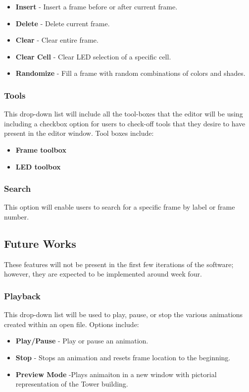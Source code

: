 \documentclass[]{article}
\begin{document}
\begin{itemize}
\item \textbf{Insert} - Insert a frame before or after current frame.
\item \textbf{Delete} - Delete current frame.
\item \textbf{Clear} - Clear entire frame.
\item \textbf{Clear Cell} - Clear LED selection of a specific cell.
\item \textbf{Randomize} - Fill a frame with random combinations of colors and shades.
\end{itemize}

\subsubsection{Tools}

{This drop-down list will include all the tool-boxes that the editor will be using including a checkbox option for users to check-off tools that they desire to have present in the editor window. Tool boxes include:}

\begin{itemize}
\item \textbf{Frame toolbox}
\item \textbf{LED toolbox}

\end{itemize}

\subsubsection{Search}

{This option will enable users to search for a specific frame by label or frame number.}

\subsection{Future Works}

{These features will not be present in the first few iterations of the software; however, they are expected to be implemented around week four. }

\subsubsection{Playback}

{This drop-down list will be used to play, pause, or stop the various animations created within an open file. Options include: }
\begin{itemize}
\item \textbf{Play/Pause} - Play or pause an animation.
\item \textbf{Stop} - Stops an animation and resets frame location to the beginning.
\item \textbf{Preview Mode} -Plays animaiton in a new window with pictorial representation of the Tower building.

\end{itemize}
\end{document}
